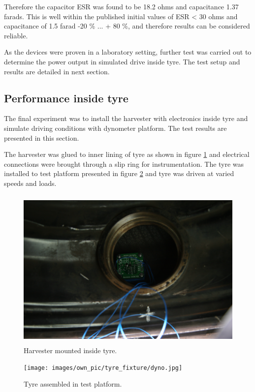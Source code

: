 Therefore the capacitor ESR was found to be 18.2 ohms and capacitance 1.37 farads. This is well within the published initial values of ESR < 30 ohms and capacitance of 1.5 farad -20 \% ... + 80 \%, and therefore results can be considered reliable. 

As the devices were proven in a laboratory setting, further test was carried out to determine the power output in simulated drive inside tyre. The test setup and results are detailed in next section.

\subsection{Performance inside tyre}
The final experiment was to install the harvester with electronics inside tyre and simulate driving conditions with dynometer platform. The test results are presented in this section. 

The harvester was glued to inner lining of tyre as shown in figure \ref{fig:harvester_potted} and electrical connections were brought through a slip ring for instrumentation. The tyre was installed to test platform presented in figure \ref{fig:tyre_platform} and tyre was driven at varied speeds and loads. 

\begin{figure}[htb]
\begin{center}
\includegraphics[height=8cm]{images/own_pic/tyre_fixture/piezo_bq_mount.jpg}
\end{center}
\caption{\label{fig:harvester_potted}Harvester mounted inside tyre.}
\end{figure}

\begin{figure}[htb]
\begin{center}
\texttt{[image: images/own\_pic/tyre\_fixture/dyno.jpg]}
\end{center}
\caption{\label{fig:tyre_platform} Tyre assembled in test platform.}
\end{figure}

